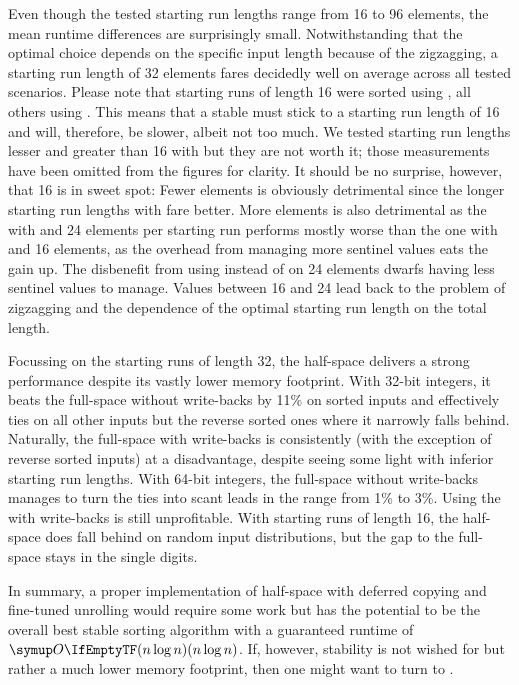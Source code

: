 Even though the tested starting run lengths range from 16 to 96 elements, the mean runtime differences are surprisingly small.
Notwithstanding that the optimal choice depends on the specific input length because of the zigzagging, a starting run length of 32 elements fares decidedly well on average across all tested scenarios.
Please note that starting runs of length 16 were sorted using \IS{}, all others using \ShS{}.
This means that a stable \MS{} must stick to a starting run length of 16 and will, therefore, be slower, albeit not too much.
We tested starting run lengths lesser and greater than 16 with \IS{} but they are not worth it;
those measurements have been omitted from the figures for clarity.
It should be no surprise, however, that 16 is in sweet spot:
Fewer elements is obviously detrimental since the longer starting run lengths with \ShS{} fare better.
More elements is also detrimental as the \MS{} with \ShS{} and 24 elements per starting run performs mostly worse than the one with \IS{} and 16 elements, as the overhead from managing more sentinel values eats the gain up.
The disbenefit from using \IS{} instead of \ShS{} on 24 elements dwarfs having less sentinel values to manage.
Values between 16 and 24 lead back to the problem of zigzagging and the dependence of the optimal starting run length on the total length.

Focussing on the starting runs of length 32, the half-space \MS{} delivers a strong performance despite its vastly lower memory footprint.
With 32-bit integers, it beats the full-space \MS{} without write-backs by 11\% on sorted inputs and effectively ties on all other inputs but the reverse sorted ones where it narrowly falls behind.
Naturally, the full-space \MS{} with write-backs is consistently (with the exception of reverse sorted inputs) at a disadvantage, despite seeing some light with inferior starting run lengths.
With 64-bit integers, the full-space \MS{} without write-backs manages to turn the ties into scant leads in the range from 1\% to 3\%.
Using the \MS{} with write-backs is still unprofitable.
With starting runs of length 16, the half-space \MS{} does fall behind on random input distributions, but the gap to the full-space \MS{} stays in the single digits.

In summary, a proper implementation of half-space \MS{} with deferred copying and fine-tuned unrolling would require some work but has the potential to be the overall best stable sorting algorithm with a guaranteed runtime of \(\bigoh{n \log n}\).
If, however, stability is not wished for but rather a much lower memory footprint, then one might want to turn to \HS{}.
